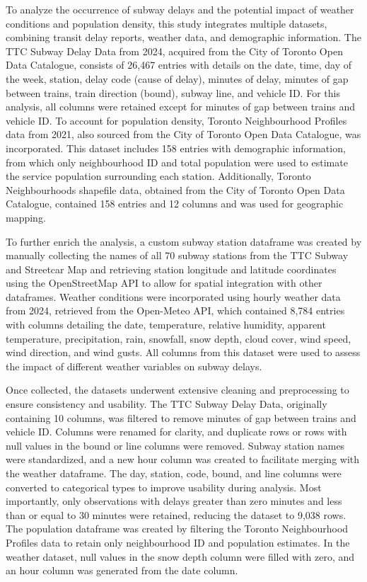 \documentclass[
  letterpaper,
  DIV=11,
  numbers=noendperiod]{scrartcl}
\begin{document}
To analyze the occurrence of subway delays and the potential impact of
weather conditions and population density, this study integrates
multiple datasets, combining transit delay reports, weather data, and
demographic information. The TTC Subway Delay Data from 2024, acquired
from the City of Toronto Open Data Catalogue, consists of 26,467 entries
with details on the date, time, day of the week, station, delay code
(cause of delay), minutes of delay, minutes of gap between trains, train
direction (bound), subway line, and vehicle ID. For this analysis, all
columns were retained except for minutes of gap between trains and
vehicle ID. To account for population density, Toronto Neighbourhood
Profiles data from 2021, also sourced from the City of Toronto Open Data
Catalogue, was incorporated. This dataset includes 158 entries with
demographic information, from which only neighbourhood ID and total
population were used to estimate the service population surrounding each
station. Additionally, Toronto Neighbourhoods shapefile data, obtained
from the City of Toronto Open Data Catalogue, contained 158 entries and
12 columns and was used for geographic mapping.

To further enrich the analysis, a custom subway station dataframe was
created by manually collecting the names of all 70 subway stations from
the TTC Subway and Streetcar Map and retrieving station longitude and
latitude coordinates using the OpenStreetMap API to allow for spatial
integration with other dataframes. Weather conditions were incorporated
using hourly weather data from 2024, retrieved from the Open-Meteo API,
which contained 8,784 entries with columns detailing the date,
temperature, relative humidity, apparent temperature, precipitation,
rain, snowfall, snow depth, cloud cover, wind speed, wind direction, and
wind gusts. All columns from this dataset were used to assess the impact
of different weather variables on subway delays.

Once collected, the datasets underwent extensive cleaning and
preprocessing to ensure consistency and usability. The TTC Subway Delay
Data, originally containing 10 columns, was filtered to remove minutes
of gap between trains and vehicle ID. Columns were renamed for clarity,
and duplicate rows or rows with null values in the bound or line columns
were removed. Subway station names were standardized, and a new hour
column was created to facilitate merging with the weather dataframe. The
day, station, code, bound, and line columns were converted to
categorical types to improve usability during analysis. Most
importantly, only observations with delays greater than zero minutes and
less than or equal to 30 minutes were retained, reducing the dataset to
9,038 rows. The population dataframe was created by filtering the
Toronto Neighbourhood Profiles data to retain only neighbourhood ID and
population estimates. In the weather dataset, null values in the snow
depth column were filled with zero, and an hour column was generated
from the date column.
\end{document}
